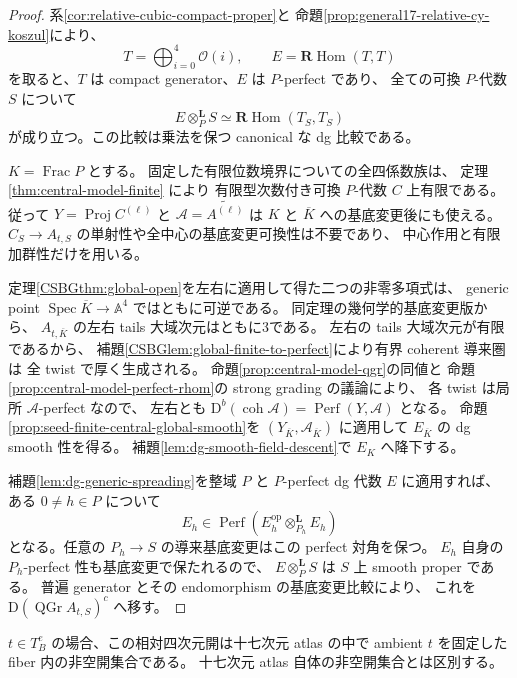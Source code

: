 \begin{proof}
系\ref{cor:relative-cubic-compact-proper}と
命題\ref{prop:general17-relative-cy-koszul}により、
\[
 T=\bigoplus_{i=0}^{4}\mathcal O(i),\qquad
 E=\mathbf R\operatorname{Hom}(T,T)
\]
を取ると、$T$ は compact generator、$E$ は $P$-perfect であり、
全ての可換 $P$-代数 $S$ について
\[
 E\otimes_P^{\mathbf L}S
   \simeq\mathbf R\operatorname{Hom}(T_S,T_S)
\]
が成り立つ。この比較は乗法を保つ canonical な dg 比較である。

$K=\operatorname{Frac}P$ とする。
固定した有限位数境界についての全四係数族は、
定理\ref{thm:central-model-finite} により
有限型次数付き可換 $P$-代数 $C$ 上有限である。
従って $Y=\operatorname{Proj}C^{(\ell)}$ と
$\mathscr A=\widetilde{A^{(\ell)}}$ は
$K$ と $\overline K$ への基底変更後にも使える。
$C_S\to A_{t,S}$ の単射性や全中心の基底変更可換性は不要であり、
中心作用と有限加群性だけを用いる。

定理\ref{CSBGthm:global-open}を左右に適用して得た二つの非零多項式は、
generic point $\operatorname{Spec}\overline K\to\mathbb A^4$ ではともに可逆である。
同定理の幾何学的基底変更版から、
$A_{t,\overline K}$ の左右 tails 大域次元はともに3である。
左右の tails 大域次元が有限であるから、
補題\ref{CSBGlem:global-finite-to-perfect}により有界 coherent 導来圏は
全 twist で厚く生成される。
命題\ref{prop:central-model-qgr}の同値と
命題\ref{prop:central-model-perfect-rhom}の strong grading の議論により、
各 twist は局所 $\mathscr A$-perfect なので、
左右とも $\mathrm D^b(\operatorname{coh}\mathscr A)=\operatorname{Perf}(Y,\mathscr A)$ となる。
命題\ref{prop:seed-finite-central-global-smooth}を
$(Y_{\overline K},\mathscr A_{\overline K})$ に適用して
$E_{\overline K}$ の dg smooth 性を得る。
補題\ref{lem:dg-smooth-field-descent}で $E_K$ へ降下する。

補題\ref{lem:dg-generic-spreading}を整域 $P$ と $P$-perfect dg 代数 $E$ に適用すれば、
ある $0\ne h\in P$ について
\[
 E_h\in\operatorname{Perf}
    (E_h^{\mathrm{op}}\otimes_{P_h}^{\mathbf L}E_h)
\]
となる。任意の $P_h\to S$ の導来基底変更はこの perfect 対角を保つ。
$E_h$ 自身の $P_h$-perfect 性も基底変更で保たれるので、
$E\otimes_P^{\mathbf L}S$ は $S$ 上 smooth proper である。
普遍 generator とその endomorphism の基底変更比較により、
これを $\mathrm D(\operatorname{QGr}A_{t,S})^c$ へ移す。
\end{proof}

\begin{remark}
$t\in T_B^e$ の場合、この相対四次元開は十七次元 atlas の中で
ambient $t$ を固定した fiber 内の非空開集合である。
十七次元 atlas 自体の非空開集合とは区別する。
\end{remark}

